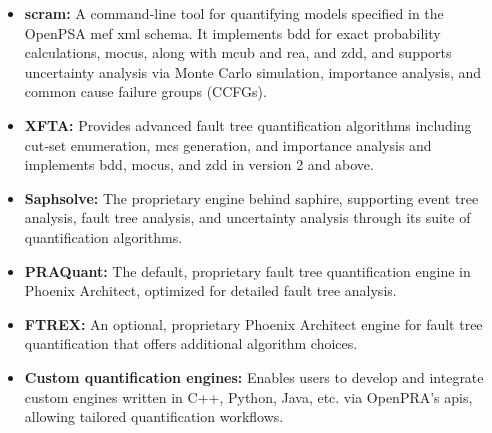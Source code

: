 \begin{itemize}
  \item \textbf{scram:} A command‑line tool for quantifying models specified in the OpenPSA \acrshort{mef} \acrshort{xml} schema. It implements \acrshort{bdd} for exact probability calculations, \acrshort{mocus}, along with \acrshort{mcub} and \acrshort{rea}, and \acrshort{zdd}, and supports uncertainty analysis via Monte Carlo simulation, importance analysis, and common cause failure groups (CCFGs).
  \item \textbf{XFTA:} Provides advanced fault tree quantification algorithms including cut‑set enumeration, \acrshort{mcs} generation, and importance analysis and implements \acrshort{bdd}, \acrshort{mocus}, and \acrshort{zdd} in version 2 and above.
  \item \textbf{Saphsolve:} The proprietary engine behind \acrshort{saphire}, supporting event tree analysis, fault tree analysis, and uncertainty analysis through its suite of quantification algorithms.
  \item \textbf{PRAQuant:} The default, proprietary fault tree quantification engine in Phoenix Architect, optimized for detailed fault tree analysis.
  \item \textbf{FTREX:} An optional, proprietary Phoenix Architect engine for fault tree quantification that offers additional algorithm choices.
  \item \textbf{Custom quantification engines:} Enables users to develop and integrate custom engines written in C++, Python, Java, etc. via OpenPRA’s \acrfull{api}s, allowing tailored quantification workflows.
\end{itemize}

